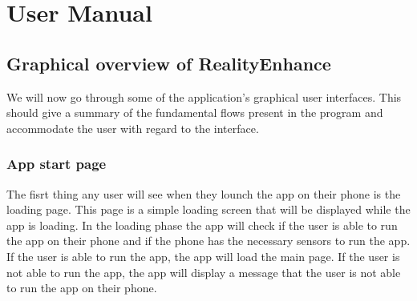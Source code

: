 \chapter{User Manual}\label{cap:evaluation}
\section{Graphical overview of RealityEnhance}
We will now go through some of the application's graphical user interfaces. This should give a summary of the fundamental flows present in the program and accommodate the user with regard to the interface.
\pagebreak

\subsection{App start page}
The fisrt thing any user will see when they lounch the app on their phone is the loading page. This page is a simple loading screen that will be displayed while the app is loading. In the loading phase the app will check if the user is able to run the app on their phone and if the phone has the necessary sensors to run the app. If the user is able to run the app, the app will load the main page. If the user is not able to run the app, the app will display a message that the user is not able to run the app on their phone.
